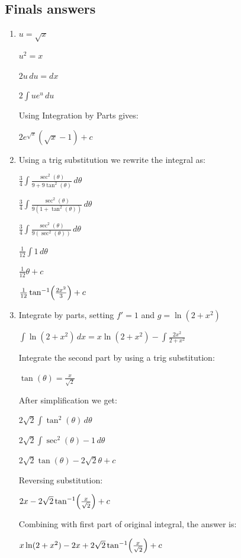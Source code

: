 \documentclass[12pt, letterpaper]{article}
\begin{document}
\subsection*{Finals answers}
\begin{enumerate}[itemsep=1cm]
    \item 
    $u= \sqrt{x}$
    
    $u^2 = x$
    
    $2u\,du = dx$
    
    $2\int u e^u\,du$
    
    Using Integration by Parts gives:
    
    $2e^{\sqrt{x}}(\sqrt{x}-1)+c$

    \item 
    Using a trig substitution we rewrite the integral as:
    
    $\frac{3}{4} \int \frac{\sec^2(\theta)}{9+9\tan^2(\theta)}\,d\theta$
    
    $\frac{3}{4} \int \frac{\sec^2(\theta)}{9(1+\tan^2(\theta))}\,d\theta$
    
    $\frac{3}{4} \int \frac{\sec^2(\theta)}{9(\sec^2(\theta))}\,d\theta$
    
    $\frac{1}{12} \int 1\,d\theta$
    
    $\frac{1}{12}\theta +c$
    
    $\frac{1}{12} \tan^{-1}\Bigl(\frac{2x^2}{3}\Bigr)+c$

    \item
    Integrate by parts, setting $f'=1$ and $g=\ln(2+x^2)$
    
    $\int \ln(2+x^2)\,dx = x\ln(2+x^2)-\int \frac{2x^2}{2+x^2}$

    Integrate the second part by using a trig substitution:

    $\tan(\theta)=\frac{x}{\sqrt{2}}$

    After simplification we get:

    $2\sqrt{2}\int \tan^2(\theta)\,d\theta$
    
    $2\sqrt{2}\int \sec^2(\theta)-1\,d\theta$

    $2\sqrt{2}\tan(\theta)-2\sqrt{2}\theta+c$

    Reversing substitution:

    $2x - 2\sqrt{2}\tan^{-1}\Bigl(\frac{x}{\sqrt{2}}\Bigr)+c$

    Combining with first part of original integral, the answer is:

    $x\ln(2+x^2)-2x+2\sqrt{2}\tan^{-1}\Bigl(\frac{x}{\sqrt{2}}\Bigr)+c$


\end{enumerate}
\end{document}
